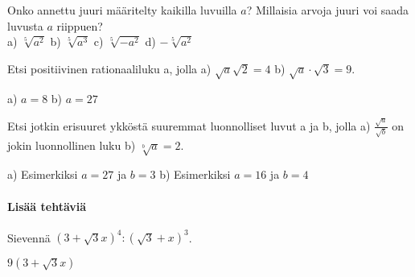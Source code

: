 \begin{tehtavasivu}
\begin{tehtava}
Onko annettu juuri määritelty kaikilla luvuilla $a$? Millaisia arvoja juuri voi saada luvusta $a$ riippuen?\\
a) $\sqrt[5]{a^2}$ \quad b) $\sqrt[5]{a^3}$ \quad c) $\sqrt[5]{-a^2}$ \quad d) $- \sqrt[5]{a^2}$

\begin{vastaus}

\end{vastaus}
\end{tehtava}

\begin{tehtava} Etsi positiivinen rationaaliluku a, jolla
a) $\sqrt{a} \sqrt{2} = 4$  \quad b)   $ \sqrt{a}\cdot{\sqrt{3}} =9 $.   \quad 
\begin{vastaus}
a) $a=8$ \quad b) $a=27$ \quad 
\end{vastaus}
\end{tehtava}


\begin{tehtava} Etsi jotkin erisuuret ykköstä suuremmat luonnolliset luvut a ja b, jolla 
a) $\frac{\sqrt{a}}{\sqrt{b}}$ on jokin luonnollinen luku  \quad b) $\sqrt[b]{a}=2$.   
\begin{vastaus}
a) Esimerkiksi $a=27$ \quad ja \quad $b=3$  \quad b) Esimerkiksi $a=16$ \quad ja \quad $b=4$ 
\end{vastaus}
\end{tehtava}



\paragraph*{Lisää tehtäviä}

\begin{tehtava}
Sievennä $(3+\sqrt{3}x)^4:(\sqrt{3}+x)^3$.
\begin{vastaus}
$9(3 + \sqrt{3}x)$
\end{vastaus}
\end{tehtava}


\end{tehtavasivu}
